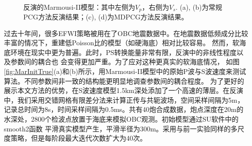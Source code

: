 \begin{figure}[!htb]
    \begin{center}
		\\
        \caption{
			反演的Marmousi-II模型：其中左侧为$V_p$，右侧为$V_s$. (a), (b)为常规PCG方法反演结果；(c), (d)为MDPCG方法反演结果。
    }
    \label{fig:MarInvert}
    \end{center}
\end{figure}
过去十年间，很多EFWI策略被用在了OBC地震数据中。在地震数据低频成分比较丰富的情况下，重建低Poisson比的模型（如硬海底）相对比较容易\cite[]{bae:2012}。
然而，软海底环境在现实中更为普遍。此时，PS转换能量非常有限，反演中的非线性程度以及参数间的耦合也
会变得更加严重。为了应对这种更真实的软海底情况，
如图\ref{fig:MarInitTrue}(a)和(b)所示，用Marmousi-II模型中的原始P波与S波速度来测试算法。不同参数间非一致的结构能更明显地调查参数间的耦合程度。
为了更好的展示本文方法的优势，在S波速度模型1.5km深处添加了一个高速的薄层。在反演中，我们采用交错网格有限差分法来计算正传与共轭波场，空间采样间隔为5m，
记录总时间为8s，时间采样间隔为0.5ms。共有40炮合成数据，炮点深度在20m的水深处，2800个检波点放置于海底来模拟OBC观测。初始模型通过SU软件中的smooth2函数
平滑真实模型产生，平滑半径为300m。采用与前一实验同样的多尺度策略，但是每阶段最大迭代次数扩大为40次。


